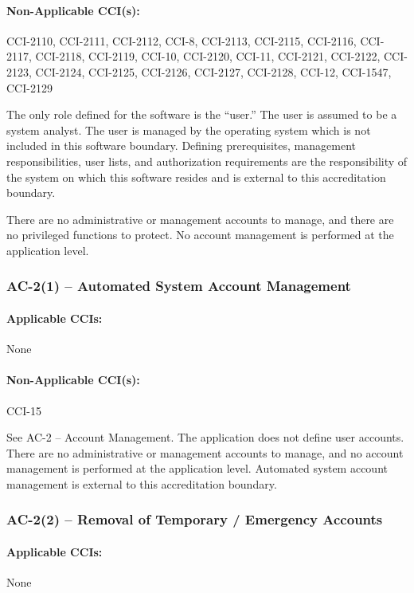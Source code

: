 \documentclass[letterpaper, 10pt, twoside]{article}
\begin{document}
\paragraph{Non-Applicable CCI(s):} CCI-2110, CCI-2111, CCI-2112, CCI-8, CCI-2113, CCI-2115, CCI-2116, CCI-2117, CCI-2118, CCI-2119, CCI-10, CCI-2120, CCI-11, CCI-2121, CCI-2122, CCI-2123, CCI-2124, CCI-2125, CCI-2126, CCI-2127, CCI-2128, CCI-12, CCI-1547, CCI-2129

The only role defined for the software is the ``user.'' The user is assumed to be a system analyst. The user is managed by the operating system which is not included in this software boundary. Defining prerequisites, management responsibilities, user lists, and authorization requirements are the responsibility of the system on which this software resides and is external to this accreditation boundary.

There are no administrative or management accounts to manage, and there are no privileged functions to protect. No account management is performed at the application level.

\subsubsection{AC-2(1) -- Automated System Account Management}

\paragraph{Applicable CCIs:} None

\paragraph{Non-Applicable CCI(s):} CCI-15

See AC-2 – Account Management. The application does not define user accounts. There are no administrative or management accounts to manage, and no account management is performed at the application level. Automated system account management is external to this accreditation boundary.

\subsubsection{AC-2(2) -- Removal of Temporary / Emergency Accounts}

\paragraph{Applicable CCIs:} None
\end{document}
